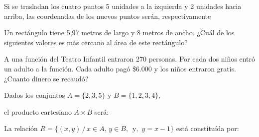 \documentclass[letterpaper,10pt]{examdesign}
\begin{document}
\begin{multiplechoice}[rearrange=no,keycolumns=4,examcolumns=2]
\begin{block}
\begin{question}
Si se trasladan los cuatro puntos 5 unidades a la izquierda y 2 unidades hacia arriba, las coordenadas de los nuevos puntos serán, respectivamente
\end{question}
\end{block}
\begin{question}
Un rectángulo tiene 5,97 metros de largo y 8 metros de ancho. ¿Cuál de los siguientes valores es más cercano al área de este rectángulo?
\end{question}
\begin{question}
A una función del Teatro Infantil entraron 270 personas. Por cada dos niños entró un adulto a la función. Cada adulto pagó \$6.000 y los niños entraron gratis. ¿Cuanto dinero se recaudó?
    
\end{question}
\begin{block}
Dados los conjuntos $A=\{2,3,5\}$ y $B=\{1,2,3,4\}$,
\begin{question}
el producto cartesiano $A\times B$ ser\'{a}:
\end{question}
\begin{question}
La relación $R=\{(x,y)\,/\, x\in A,\, y\in B, \, \text{ y, } \, y=x-1 \} $ está constituída por:
\end{question}
\end{block}
\end{multiplechoice}
\end{document}

